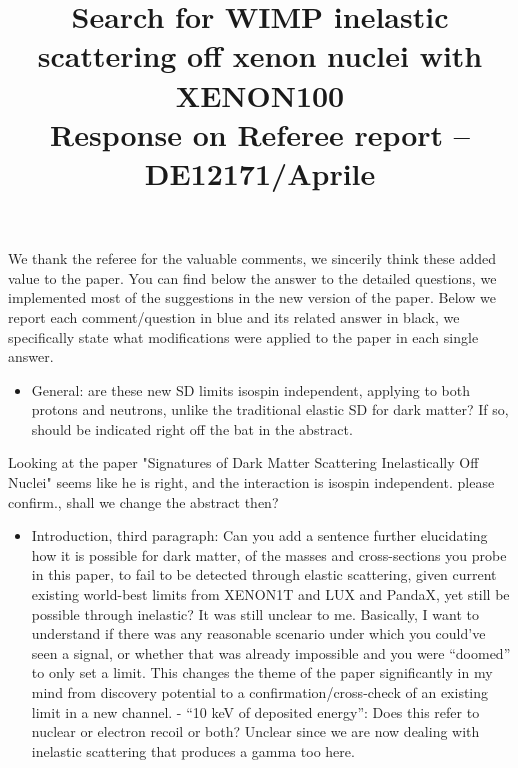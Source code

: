 \documentclass{article}
\begin{document}
\title{ \textbf{ Search for WIMP inelastic scattering off xenon nuclei with XENON100} \\  Response on Referee report -- DE12171/Aprile  }

\maketitle



We thank the referee for the valuable comments, we sincerily think these added  value to the paper. 
You can find below the answer to the detailed questions, we implemented most of the suggestions in the new version of the paper.
Below we report each  comment/question in blue and its related answer in black, we specifically state what modifications
were applied to the paper in each single answer.


\begin{itemize}
	\item {\color{blue} General: are these new SD limits isospin independent, applying to both protons and neutrons, unlike the traditional elastic SD for dark matter? If so, should be indicated right off the bat in the abstract.}
\end{itemize}

Looking at the paper "Signatures of Dark Matter Scattering Inelastically Off Nuclei" seems like he is right,
and the interaction is isospin independent. {\color{red} please confirm.}, shall we change the abstract then?

\begin{itemize}
	\item {\color{blue} Introduction, third paragraph: Can you add a sentence further
elucidating how it is possible for dark matter, of the masses and
cross-sections you probe in this paper, to fail to be detected through
elastic scattering, given current existing world-best limits from
XENON1T and LUX and PandaX, yet still be possible through inelastic?
It was still unclear to me. Basically, I want to understand if there
was any reasonable scenario under which you could’ve seen a signal, or
whether that was already impossible and you were “doomed” to only set
a limit. This changes the theme of the paper significantly in my mind
from discovery potential to a confirmation/cross-check of an existing
limit in a new channel. - “10 keV of deposited energy”: Does this
refer to nuclear or electron recoil or both? Unclear since we are now
dealing with inelastic scattering that produces a gamma too here.}
\end{itemize}
\end{document}
